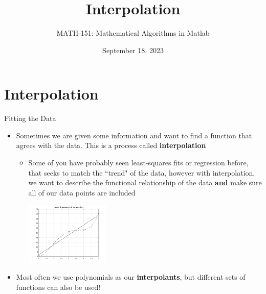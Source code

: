 {}\documentclass[letterpaper,
compress,
xcolor=x11names,
]{beamer}
\begin{document}
	\title{Interpolation}
	\author{MATH-151:  Mathematical Algorithms in Matlab}
	\date[202X]{September 18, 2023}




\begin{frame}
\titlepage
\end{frame}
\section{Interpolation}

\begin{frame}{Fitting the Data}
	\footnotesize
	\begin{itemize}
		\item Sometimes we are given some information and want to find a function that agrees with the data. This is a process called \textbf{interpolation}
		\begin{itemize}
			\item<2-> Some of you have probably seen least-squares fits or regression before, that seeks to match the ``trend" of the data, however with interpolation, we want to describe the functional relationship of the data \textbf{and} make sure all of our data points are included
			\begin{center}
				\includegraphics[height = 3cm]{interp_vs_ls.png}
			\end{center}
		\end{itemize}
		\item<3-> Most often we use polynomials as our \textbf{interpolants}, but different sets of functions can also be used!
	\end{itemize}
\end{frame}
\end{document}

